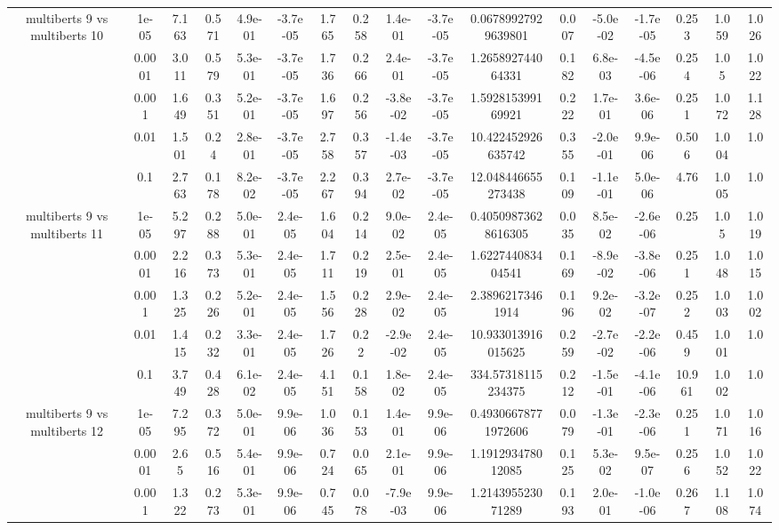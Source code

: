 \begin{tabular}{|c|c|c|c|c|c|c|c|c|c|c|c|c|c|c|c|c|}
\hline
\multirow{5}{*}{multiberts 9 vs multiberts 10} & 1e-05 & 7.163 & 0.571 & 4.9e-01 & -3.7e-05 & 1.765 & 0.258 & 1.4e-01 & -3.7e-05 & 0.06789927929639801 & 0.007 & -5.0e-02 & -1.7e-05 & 0.253 & 1.059 & 1.026 \\
 & 0.0001 & 3.011 & 0.579 & 5.3e-01 & -3.7e-05 & 1.736 & 0.266 & 2.4e-01 & -3.7e-05 & 1.265892744064331 & 0.182 & 6.8e-03 & -4.5e-06 & 0.254 & 1.05 & 1.022 \\
 & 0.001 & 1.649 & 0.351 & 5.2e-01 & -3.7e-05 & 1.697 & 0.256 & -3.8e-02 & -3.7e-05 & 1.592815399169921 & 0.222 & 1.7e-01 & 3.6e-06 & 0.251 & 1.072 & 1.128 \\
 & 0.01 & 1.501 & 0.24 & 2.8e-01 & -3.7e-05 & 2.758 & 0.357 & -1.4e-03 & -3.7e-05 & 10.422452926635742 & 0.355 & -2.0e-01 & 9.9e-06 & 0.506 & 1.004 & 1.0 \\
 & 0.1 & 2.763 & 0.178 & 8.2e-02 & -3.7e-05 & 2.267 & 0.394 & 2.7e-02 & -3.7e-05 & 12.048446655273438 & 0.109 & -1.1e-01 & 5.0e-06 & 4.76 & 1.005 & 1.0 \\
\hline
\multirow{5}{*}{multiberts 9 vs multiberts 11} & 1e-05 & 5.297 & 0.288 & 5.0e-01 & 2.4e-05 & 1.604 & 0.214 & 9.0e-02 & 2.4e-05 & 0.40509873628616305 & 0.035 & 8.5e-02 & -2.6e-06 & 0.25 & 1.05 & 1.019 \\
 & 0.0001 & 2.216 & 0.373 & 5.3e-01 & 2.4e-05 & 1.711 & 0.219 & 2.5e-01 & 2.4e-05 & 1.622744083404541 & 0.169 & -8.9e-02 & -3.8e-06 & 0.251 & 1.048 & 1.015 \\
 & 0.001 & 1.325 & 0.226 & 5.2e-01 & 2.4e-05 & 1.556 & 0.228 & 2.9e-02 & 2.4e-05 & 2.38962173461914 & 0.196 & 9.2e-02 & -3.2e-07 & 0.252 & 1.003 & 1.002 \\
 & 0.01 & 1.415 & 0.232 & 3.3e-01 & 2.4e-05 & 1.726 & 0.22 & -2.9e-02 & 2.4e-05 & 10.933013916015625 & 0.259 & -2.7e-02 & -2.2e-06 & 0.459 & 1.001 & 1.0 \\
 & 0.1 & 3.749 & 0.428 & 6.1e-02 & 2.4e-05 & 4.151 & 0.158 & 1.8e-02 & 2.4e-05 & 334.57318115234375 & 0.212 & -1.5e-01 & -4.1e-06 & 10.961 & 1.002 & 1.0 \\
\hline
\multirow{5}{*}{multiberts 9 vs multiberts 12} & 1e-05 & 7.295 & 0.372 & 5.0e-01 & 9.9e-06 & 1.036 & 0.153 & 1.4e-01 & 9.9e-06 & 0.49306678771972606 & 0.079 & -1.3e-01 & -2.3e-06 & 0.251 & 1.071 & 1.016 \\
 & 0.0001 & 2.65 & 0.516 & 5.4e-01 & 9.9e-06 & 0.724 & 0.065 & 2.1e-01 & 9.9e-06 & 1.191293478012085 & 0.125 & 5.3e-02 & 9.5e-07 & 0.256 & 1.052 & 1.022 \\
 & 0.001 & 1.322 & 0.273 & 5.3e-01 & 9.9e-06 & 0.745 & 0.078 & -7.9e-03 & 9.9e-06 & 1.214395523071289 & 0.193 & 2.0e-01 & -1.0e-06 & 0.267 & 1.108 & 1.074 \\

\end{tabular}
